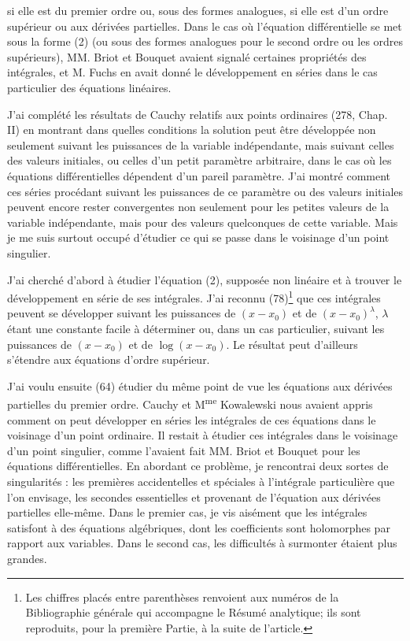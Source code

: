 \documentclass[11pt]{article}
\begin{document}
si elle est du premier ordre ou, sous des formes analogues, si elle est d’un ordre supérieur ou aux dérivées partielles. Dans le cas où l’équation différentielle se met sous la forme (2) (ou sous des formes analogues pour le second ordre ou les ordres supérieurs), MM. Briot et Bouquet avaient signalé certaines propriétés des intégrales, et M. Fuchs en avait donné le développement en séries dans le cas particulier des équations linéaires.

J’ai complété les résultats de Cauchy relatifs aux points ordinaires (278, Chap. II) en montrant dans quelles conditions la solution peut être développée non seulement suivant les puissances de la variable indépendante, mais suivant celles des valeurs initiales, ou celles d’un petit paramètre arbitraire, dans le cas où les équations différentielles dépendent d’un pareil paramètre. J’ai montré comment ces séries procédant suivant les puissances de ce paramètre ou des valeurs initiales peuvent encore rester convergentes non seulement pour les petites valeurs de la variable indépendante, mais pour des valeurs quelconques de cette variable. Mais je me suis surtout occupé d’étudier ce qui se passe dans le voisinage d’un point singulier.

J’ai cherché d’abord à étudier l’équation (2), supposée non linéaire et à trouver le développement en série de ses intégrales. J’ai reconnu (78)\footnote{Les chiffres placés entre parenthèses renvoient aux numéros de la Bibliographie générale qui accompagne le Résumé analytique; ils sont reproduits, pour la première Partie, à la suite de l’article.} que ces intégrales peuvent se développer suivant les puissances de $(x-x_0)$ et de $(x-x_0)^\lambda$, $\lambda$ étant une constante facile à déterminer ou, dans un cas particulier, suivant les puissances de $(x-x_0)$ et de $\log(x-x_0)$. Le résultat peut d’ailleurs s’étendre aux équations d’ordre supérieur.

J’ai voulu ensuite (64) étudier du même point de vue les équations aux dérivées partielles du premier ordre. Cauchy et M\textsuperscript{me} Kowalewski nous avaient appris comment on peut développer en séries les intégrales de ces équations dans le voisinage d’un point ordinaire. Il restait à étudier ces intégrales dans le voisinage d’un point singulier, comme l’avaient fait MM. Briot et Bouquet pour les équations différentielles. En abordant ce problème, je rencontrai deux sortes de singularités : les premières accidentelles et spéciales à l’intégrale particulière que l’on envisage, les secondes essentielles et provenant de l’équation aux dérivées partielles elle-même. Dans le premier cas, je vis aisément que les intégrales satisfont à des équations algébriques, dont les coefficients sont holomorphes par rapport aux variables. Dans le second cas, les difficultés à surmonter étaient plus grandes.
\end{document}
